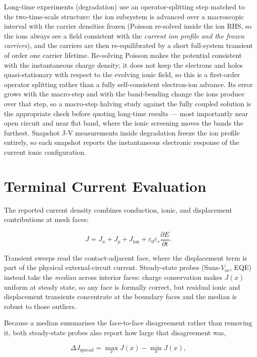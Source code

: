 \documentclass[
  11pt,
  american,
]{report}
\begin{document}
Long-time experiments (degradation) use an operator-splitting step
matched to the two-time-scale structure: the ion subsystem is advanced
over a macroscopic interval with the carrier densities frozen (Poisson
re-solved inside the ion RHS, so the ions always see a field consistent
with the \emph{current ion profile and the frozen carriers}), and the
carriers are then re-equilibrated by a short full-system transient of
order one carrier lifetime. Re-solving Poisson makes the potential
consistent with the instantaneous charge density; it does not keep the
electrons and holes quasi-stationary with respect to the evolving ionic
field, so this is a first-order operator splitting rather than a fully
self-consistent electron-ion advance. Its error grows with the
macro-step and with the band-bending change the ions produce over that
step, so a macro-step halving study against the fully coupled solution
is the appropriate check before quoting long-time results --- most
importantly near open circuit and near flat band, where the ionic
screening moves the bands the furthest. Snapshot J-V measurements inside
degradation freeze the ion profile entirely, so each snapshot reports
the instantaneous electronic response of the current ionic
configuration.

\hypertarget{terminal-current-evaluation}{%
\section{Terminal Current
Evaluation}\label{terminal-current-evaluation}}

The reported current density combines conduction, ionic, and
displacement contributions at mesh faces:

\[
J = J_n + J_p + J_\mathrm{ion} + \varepsilon_0\varepsilon_r
\frac{\partial E}{\partial t}.
\]

Transient sweeps read the contact-adjacent face, where the displacement
term is part of the physical external-circuit current. Steady-state
probes (Suns-\(V_\mathrm{oc}\), EQE) instead take the \emph{median}
across interior faces: charge conservation makes \(J(x)\) uniform at
steady state, so any face is formally correct, but residual ionic and
displacement transients concentrate at the boundary faces and the median
is robust to those outliers.

Because a median summarises the face-to-face disagreement rather than
removing it, both steady-state probes also report how large that
disagreement was,

\[
\Delta J_\mathrm{spread}=\max_x J(x)-\min_x J(x),
\]
\end{document}
